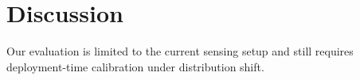 \section{Discussion}
Our evaluation is limited to the current sensing setup and still requires deployment-time calibration under distribution shift.
